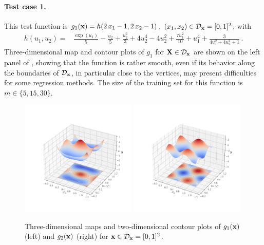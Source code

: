\paragraph{Test case 1.}

This test function is $g_1({\bf x}) = h(2\,x_1 - 1, 2\,x_2 - 1)$, $(x_1,x_2) \in \mathcal{D}_{\bf x}=[0,1]^2$, with
\begin{align*}
  h(u_1, u_2) =& \frac{\exp(u_1)}{5} - \frac{u_2}{5} + \frac{u_2^6}{3} + 4 u_2^4 - 4 u_2^2 + \frac{7u_1^2}{10} + u_1^4 + \frac{3}{4 u_1^2 + 4 u_2^2 + 1}\,. %
\end{align*}
Three-dimensional map and contour plots of $g_1$ for ${\bf X}\in\mathcal{D}_{\bf x}$ are shown on the left panel of , showing that 
the function is rather smooth, even if its behavior along the boundaries of $\mathcal{D}_{\bf x}$, in particular close to the vertices, may present difficulties for some regression methods. 
The size of the training set for this function is $m\in\{5, 15, 30\}$.


\begin{figure}
  \centering
  \includegraphics[width=0.49\textwidth]{./part2/figures/SIS/irregular_function3D.pdf}
    \includegraphics[width=0.49\textwidth]{./part2/figures/SIS/cosin2_function3D.pdf}
  \caption{Three-dimensional maps and two-dimensional contour plots of $g_1({\bf x})$ (left) and $g_2({\bf x})$ (right) for ${\bf x}\in\mathcal{D}_{\bf x}=[0,1]^2$.} 
  \label{fig:f1&f2}
\end{figure}


